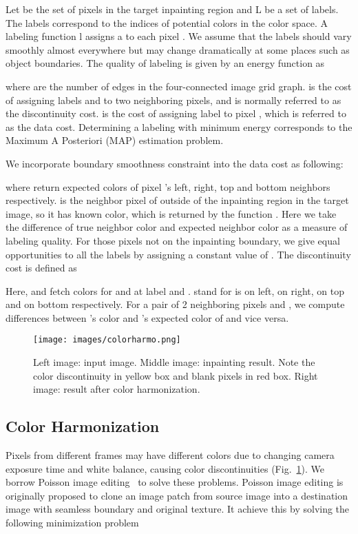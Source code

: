 \documentclass[runningheads]{llncs}
\begin{document}
Let  be the set of pixels in the target inpainting region and L be a set of labels. The labels correspond to the indices of potential colors in the color space. A labeling function l assigns a  to each pixel . We assume that the labels should vary smoothly almost everywhere but may change dramatically at some places such as object boundaries. The quality of labeling is given by an energy function as 
 
where  are the number of edges in the four-connected image grid graph.  is the cost of assigning labels  and  to two neighboring pixels, and is normally referred to as the discontinuity cost.  is the cost of assigning label  to pixel ,  which is referred to as the data cost. Determining a labeling with minimum energy corresponds to the Maximum A Posteriori (MAP) estimation problem.

We incorporate boundary smoothness constraint into the data cost as following:

where  return expected colors of pixel 's left, right, top and bottom neighbors respectively.  is the neighbor pixel of  outside of the inpainting region in the target image, so it has known color, which is returned by the function . Here we take the difference of true neighbor color and expected neighbor color as a measure of labeling quality. For those pixels not on the inpainting boundary, we give equal opportunities to all the labels by assigning a constant value of . The discontinuity cost is defined as

Here,  and  fetch colors for  and  at label  and .  stand for  is on left, on right, on top and on bottom respectively. For a pair of 2 neighboring pixels  and , we compute differences between 's color and 's expected color of  and vice versa.





\begin{figure}[t!]
\centering
\texttt{[image: images/colorharmo.png]}
   \caption{Left image: input image. Middle image: inpainting result. Note the color discontinuity in yellow box and blank pixels in red box. Right image: result after color harmonization. }
\label{fig:colorharmo}
\end{figure}

\subsection{Color Harmonization}
Pixels from different frames may have different colors due to changing camera exposure time and white balance, causing color discontinuities (Fig.~\ref{fig:colorharmo}). We borrow Poisson image editing~\cite{Perez:2003:PIE:1201775.882269} to solve these problems. Poisson image editing is originally proposed to clone an image patch from source image into a destination image with seamless boundary and original texture. It achieve this by solving the following minimization problem 
\end{document}
